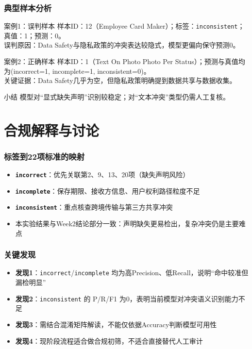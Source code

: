 \documentclass[AutoFakeBold,AutoFakeSlant]{beamer}
\begin{document}
\begin{frame}
    \frametitle{典型样本分析}
    \small
    \begin{block}{案例1：误判样本}
        样本ID：12（Employee Card Maker）；标签：\texttt{inconsistent}；真值：1；预测：0。\\
        误判原因：Data Safety与隐私政策的冲突表达较隐式，模型更偏向保守预测0。
    \end{block}
    \begin{block}{案例2：正确样本}
        样本ID：1（Text On Photo Photo Per Status）；预测与真值均为(incorrect=1, incomplete=1, inconsistent=0)。\\
        关键证据：Data Safety几乎为空，但隐私政策明确提到数据共享与数据收集。
    \end{block}
    \begin{block}{小结}
        模型对“显式缺失声明”识别较稳定；对“文本冲突”类型仍需人工复核。
    \end{block}
\end{frame}

\section{合规解释与讨论}
\begin{frame}
    \frametitle{标签到22项标准的映射}
    \begin{itemize}
        \item \textbf{\texttt{incorrect}}：优先关联第2、9、13、20项（缺失声明风险）
        \item \textbf{\texttt{incomplete}}：保存期限、接收方信息、用户权利路径粒度不足
        \item \textbf{\texttt{inconsistent}}：重点核查跨境传输与第三方共享冲突
        \item 本实验结果与Week2结论部分一致：声明缺失更易检出，复杂冲突仍是主要难点
    \end{itemize}
\end{frame}

\begin{frame}
    \frametitle{关键发现}
    \begin{itemize}
        \item \textbf{发现1}：\texttt{incorrect}/\texttt{incomplete} 均为高Precision、低Recall，说明“命中较准但漏检明显”
        \item \textbf{发现2}：\texttt{inconsistent} 的 P/R/F1 为0，表明当前模型对冲突语义识别能力不足
        \item \textbf{发现3}：需结合混淆矩阵解读，不能仅依据Accuracy判断模型可用性
        \item \textbf{发现4}：现阶段流程适合做合规初筛，不适合直接替代人工审计
    \end{itemize}
\end{frame}
\end{document}
